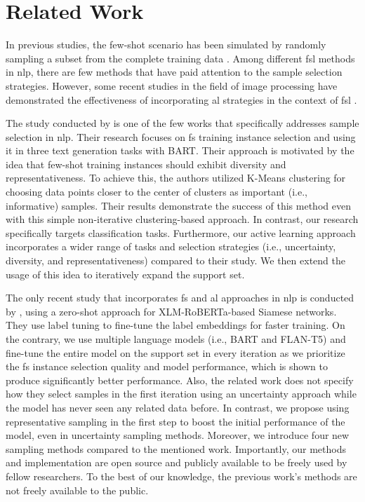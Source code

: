 \section{Related Work}
\label{sec:rel_work_section}

In previous studies, the few-shot scenario has been simulated by randomly sampling a subset from the complete training data \cite{chen-etal-2020-shot, schick2021few, gao-etal-2021-making, chen-etal-2021-revisiting, lin2022few, edwards-camacho-collados-2024-language}. Among different \gls*{fsl} methods in \gls*{nlp}, there are few methods that have paid attention to the sample selection strategies.
However, some recent studies in the field of image processing have demonstrated the effectiveness of incorporating \gls*{al} strategies in the context of \gls*{fsl} \cite{boney2019active, pezeshkpour2020utility, li2021alpn, shin2022active}.

The study conducted by \citet{chang2021training} is one of the few works that specifically addresses sample selection in \gls*{nlp}.
Their research focuses on \gls*{fs} training instance selection and using it in three text generation tasks with BART.
Their approach is motivated by the idea that few-shot training instances should exhibit diversity and representativeness. To achieve this, the authors utilized K-Means clustering for choosing data points closer to the center of clusters as important (i.e., informative) samples. Their results demonstrate the success of this method even with this simple non-iterative clustering-based approach. 
In contrast, our research specifically targets classification tasks. Furthermore, our active learning approach incorporates a wider range of tasks and selection strategies (i.e., uncertainty, diversity, and representativeness) compared to their study. We then extend the usage of this idea to iteratively expand the support set.

The only recent study that incorporates \gls*{fs} and \gls*{al} approaches in \gls*{nlp} is conducted by \citet{muller2022active}, using a zero-shot approach for XLM-RoBERTa-based Siamese networks. They use label tuning to fine-tune the label embeddings for faster training.
On the contrary, we use multiple language models (i.e., BART and FLAN-T5) and fine-tune the entire model on the support set in every iteration as we prioritize the \gls*{fs} instance selection quality and model performance, which is shown to produce significantly better performance. Also, the related work does not specify how they select samples in the first iteration using an uncertainty approach while the model has never seen any related data before. In contrast, we propose using representative sampling in the first step to boost the initial performance of the model, even in uncertainty sampling methods. Moreover, we introduce four new sampling methods compared to the mentioned work. Importantly, our methods and implementation are open source and publicly available to be freely used by fellow researchers. To the best of our knowledge, the previous work’s methods are not freely available to the public.